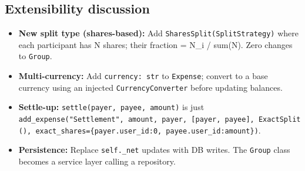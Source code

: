 \documentclass[11pt]{article}
\providecommand{\tightlist}{\setlength{\itemsep}{1pt}\setlength{\parskip}{0pt}}
\newenvironment{Shaded}{\begin{snugshade}}{\end{snugshade}}
\newcommand{\BuiltInTok}[1]{\textcolor[rgb]{0.50,0.55,0.55}{#1}}
\newcommand{\CharTok}[1]{\textcolor[rgb]{0.24,0.68,0.91}{#1}}
\newcommand{\CommentTok}[1]{\textcolor[rgb]{0.48,0.49,0.49}{#1}}
\newcommand{\ControlFlowTok}[1]{\textcolor[rgb]{0.99,0.74,0.29}{\textbf{#1}}}
\newcommand{\DecValTok}[1]{\textcolor[rgb]{0.96,0.45,0.00}{#1}}
\newcommand{\FloatTok}[1]{\textcolor[rgb]{0.96,0.45,0.00}{#1}}
\newcommand{\KeywordTok}[1]{\textcolor[rgb]{0.81,0.81,0.76}{\textbf{#1}}}
\newcommand{\NormalTok}[1]{\textcolor[rgb]{0.81,0.81,0.76}{#1}}
\newcommand{\OperatorTok}[1]{\textcolor[rgb]{0.81,0.81,0.76}{#1}}
\newcommand{\SpecialCharTok}[1]{\textcolor[rgb]{0.24,0.68,0.91}{#1}}
\newcommand{\SpecialStringTok}[1]{\textcolor[rgb]{0.85,0.27,0.33}{#1}}
\newcommand{\StringTok}[1]{\textcolor[rgb]{0.96,0.31,0.31}{#1}}
\begin{document}
\begin{Shaded}
\end{Shaded}

\subsection{Extensibility discussion}\label{extensibility-discussion-3}

\begin{itemize}
\tightlist
\item
  \textbf{New split type (shares-based):} Add \texttt{SharesSplit(SplitStrategy)} where each participant has N shares; their fraction = N\_i / sum(N). Zero changes to \texttt{Group}.
\item
  \textbf{Multi-currency:} Add \texttt{currency:\ str} to \texttt{Expense}; convert to a base currency using an injected \texttt{CurrencyConverter} before updating balances.
\item
  \textbf{Settle-up:} \texttt{settle(payer,\ payee,\ amount)} is just \texttt{add\_expense("Settlement",\ amount,\ payer,\ {[}payer,\ payee{]},\ ExactSplit(),\ exact\_shares=\{payer.user\_id:0,\ payee.user\_id:amount\})}.
\item
  \textbf{Persistence:} Replace \texttt{self.\_net} updates with DB writes. The \texttt{Group} class becomes a service layer calling a repository.
\end{itemize}
\end{document}
